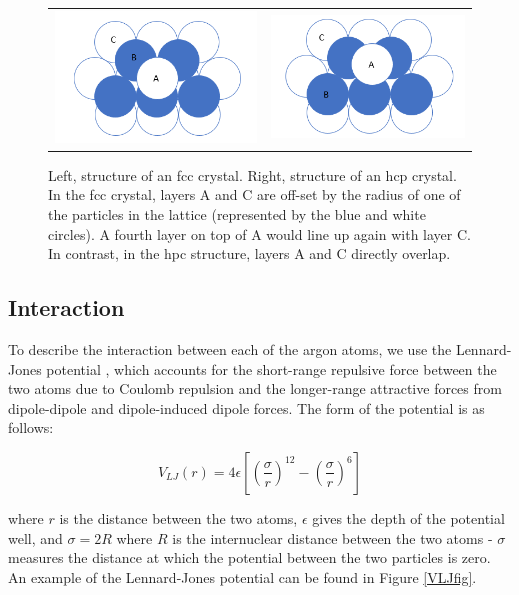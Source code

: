 \documentclass{article}
\begin{document}
\begin{multicols}{2}
\begin{figure}[H]
\begin{center}
\begin{tabular}{ c c }
\includegraphics[width=0.45\linewidth]{plots/fcc_crystal.png} & \includegraphics[width=0.45\linewidth]{plots/hcp_crystal.png}
\end{tabular}
\caption{Left, structure of an fcc crystal.  Right, structure of an hcp crystal.  In the fcc crystal, layers A and C are off-set by the radius of one of the particles in the lattice (represented by the blue and white circles).  A fourth layer on top of A would line up again with layer C.  In contrast, in the hpc structure, layers A and C directly overlap.}
\label{fcc}
\end{center}
\end{figure}

\subsection{Interaction}

To describe the interaction between each of the argon atoms, we use the Lennard-Jones potential \cite{verlet}, which accounts for the short-range repulsive force between the two atoms due to Coulomb repulsion and the longer-range attractive forces from dipole-dipole and dipole-induced dipole forces.  The form of the potential is as follows:

\begin{equation}
\label{LJpot}
V_{LJ}(r) = 4 \epsilon \left [ \left (\frac{\sigma}{r} \right )^{12} - \left (\frac{\sigma}{r} \right )^{6} \right ]
\end{equation}

\noindent where $r$ is the distance between the two atoms, $\epsilon$ gives the depth of the potential well, and $\sigma = 2R $ where $R$ is the internuclear distance between the two atoms - $\sigma$ measures the distance at which the potential between the two particles is zero.  An example of the Lennard-Jones potential can be found in Figure \ref{VLJfig}.


\end{multicols}
\end{document}
